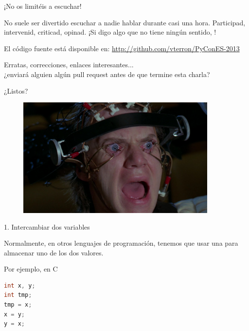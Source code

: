 \documentclass[14pt]{beamer}
\begin{document}
\begin{frame}{¡No os limitéis a escuchar!}
  \begin{center}
    No suele ser divertido escuchar a nadie hablar durante casi una
    hora. Participad, intervenid, criticad, opinad. ¡Si digo algo que
    no tiene ningún sentido, !
  \end{center}

  \begin{block}{\centering El código fuente está disponible en:}
    \centering \url{http://github.com/vterron/PyConES-2013}
  \end{block}

  \begin{center}
    \small Erratas, correcciones, enlaces interesantes...\\ ¿enviará
    alguien algún pull request antes de que termine esta charla?
  \end{center}
\end{frame}

\begin{frame}{}
  \begin{alertblock}{}
    \centering \Large ¿Listos?
  \end{alertblock}

  \begin{figure}
    \centering
    \includegraphics[height=6cm]{pics/a-clockwork-orange.jpg}
  \end{figure}
\end{frame}

\begin{frame}[fragile]{1. Intercambiar dos variables}

  \begin{center}
    Normalmente, en otros lenguajes de programación, tenemos que usar
    una  para almacenar uno de los dos
    valores.
  \end{center}

  \small
  \begin{exampleblock}{Por ejemplo, en C}
    \begin{lstlisting}[language=C]
int x, y;
int tmp;
tmp = x;
x = y;
y = x;
    \end{lstlisting}
  \end{exampleblock}
\end{frame}
\end{document}
